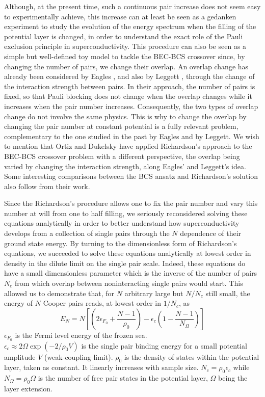 \documentclass[epj]{svjour}
\begin{document}
Although, at the present time, such a continuous pair increase
does not seem easy to experimentally achieve, this increase can at least be seen as a 
gedanken experiment to study the evolution of the energy spectrum when
the filling of the potential layer is changed, in order to understand the exact role of the Pauli
exclusion principle in superconductivity. 
This procedure can also be
seen as a simple but well-defined toy model to tackle the BEC-BCS crossover
since, by changing the number of pairs, we change their overlap. 
An overlap change has already been considered by Eagles \cite{Eagle}, 
and also by Leggett \cite{LeggettCrossover}, through the change of the interaction strength between pairs. In their approach, the number of pairs is fixed, so that Pauli blocking does not change when the overlap changes while it increases when the pair number increases. Consequently, the two types of overlap change do not involve the same physics. This is why to change the overlap by changing the pair number at constant potential is a fully relevant problem, complementary to the one studied in the past by Eagles and by Leggett. We wish to mention that Ortiz and Dukelsky have applied Richardson's approach to the BEC-BCS crossover problem with a different perspective, the overlap being varied by changing the interaction strength\cite{crossoverRich}, along Eagles' and  Leggett's idea.  Some interesting comparisons between the BCS ansatz and Richardson's solution also follow from their work.  


Since the Richardson's procedure allows one to fix the pair number and vary 
this number at will from one to half filling, we seriously reconsidered 
solving these equations analytically in order to better understand how superconductivity develops from a collection of single pairs through the $N$ dependence of their ground state energy. By turning to the dimensionless form of Richardson's equations, we succeeded to solve these equations analytically at lowest order in density in the dilute limit on the single pair scale\cite{paper1}. 
Indeed, these equations do have a small dimensionless parameter which is the inverse of the number of pairs $N_{c}$ from which overlap between noninteracting single pairs would start. 
This allowed us to demonstrate that, for $N$ arbitrary large but $N/N_{c}$ still small, 
the energy of $N$ Cooper pairs reads, at lowest order in $1/ N_{c}$, as
\begin{equation}
E_{N}= N\left[ \left( 2\epsilon _{F_{0}}+\frac{N-1}{\rho _{0}}%
\right)-\epsilon _{c}\left( 1-\frac{N-1}{N_{\Omega }}\right) \right]
\label{eq:eN}
\end{equation}%
$\epsilon _{F_{0}}$ is the Fermi level energy of the frozen sea.  \\$\epsilon _{c}\approx
2\Omega \exp \left( -2/\rho _{0}V\right) $ is the single pair binding
energy for a small potential amplitude $V$ (weak-coupling limit). $\rho
_{0} $ is the density of states within the potential
layer, taken as constant. It linearly increases with sample size. $N_{c }=\rho _{0}\epsilon _{c} $ while $N_{\Omega }=\rho _{0}\Omega $ is the number of free pair states in the potential
layer, $\Omega $ being the layer extension.
\end{document}

